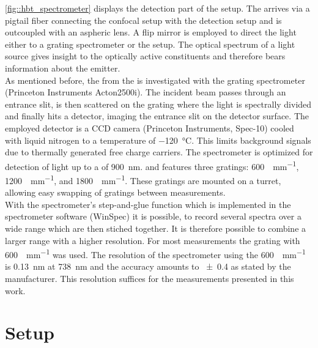 		\autoref{fig::hbt_spectrometer} displays the detection part of the setup.
		The \fl arrives via a pigtail fiber connecting the confocal setup with the detection setup and is outcoupled with an aspheric lens.
		A flip mirror is employed to direct the light either to a grating spectrometer or the \hbt setup.
		The optical spectrum of a light source gives insight to the optically active constituents and therefore bears information about the emitter.
		\\
		As mentioned before, the \fl from the \sivs is investigated with the grating spectrometer (Princeton Instruments Acton2500i).
		The incident beam passes through an entrance slit, is then scattered on the grating where the light is spectrally divided and finally hits a detector, imaging the entrance slit on the detector surface.
		The employed detector is a CCD camera (Princeton Instruments, Spec-10) cooled with liquid nitrogen to a temperature of \SI{-120}{\celsius}. This limits background signals due to thermally generated free charge carriers.
		The spectrometer is optimized for detection of light up to a \wl of \SI{900}{nm}.
		and features three gratings: \SI[per-mode=symbol]{600}{\lines\per\mm}, \SI[per-mode=symbol]{1200}{\lines\per\mm}, and \SI[per-mode=symbol]{1800}{\lines\per\mm}.
		These gratings are mounted on a turret, allowing easy swapping of gratings between measurements.
		\\
		With the spectrometer's step-and-glue function which is implemented in the spectrometer software (WinSpec) it is possible, to record several spectra over a wide \wl range which are then stiched together.
		It is therefore possible to combine a larger \wl range with a higher resolution.
		For most measurements the grating with \SI[per-mode=symbol]{600}{\lines\per\mm} was used.
		The resolution of the spectrometer using the \SI{600}{\lines\per\mm} is \SI{0.13}{nm} at \SI{738}{nm} and the accuracy amounts to \num{\pm0.4} as stated by the manufacturer.
		This resolution suffices for the measurements presented in this work.

	\section[HBT]{\HBT Setup}\label{sec::methods_hbt}

